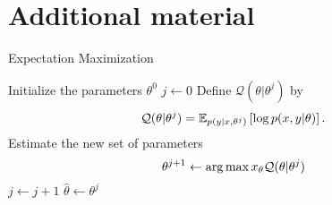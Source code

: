 \chapter{Additional material}
\label{chap:appendix}


\begin{algorithm}[htbp!]
    \caption{Expectation Maximization \citep{dempster1977maximum} }
    \label{algo:em_algorithm}
  \begin{algorithmic}[1]
    \State Initialize the parameters $\theta^0$
    \State $j\leftarrow 0$
        \State Define $\mathcal{Q}(\theta|\theta^j)$ by 
        \begin{equation}
        \label{eq:e-step}
        \mathcal{Q}(\theta|\theta^j)= {\mathbb{E}}_{p(y|x,\theta^j)}
        \left[\log p(x,y|\theta)\right] \text{.}
        \end{equation}
        \State Estimate the new set of parameters
        \begin{equation}
        \theta^{j+1} \leftarrow \operatorname*{arg\,max}x_{\theta} \mathcal{Q}(\theta|\theta^j)
        \end{equation}
        \State  $j\leftarrow j+1$
    \EndWhile
    \State  $\hat{\theta} \leftarrow \theta^{{j}}$
  \end{algorithmic}
  \end{algorithm}



